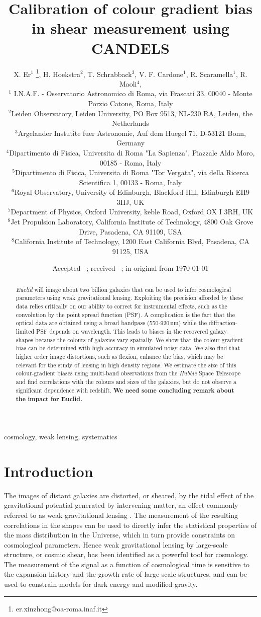 \documentclass[useAMS,usenatbib]{mnras}
\title[Colour gradient bias]
{Calibration of colour gradient bias in shear measurement using CANDELS}
\author[Xer et al.]%
{
X. Er$^1$ \thanks{er.xinzhong@oa-roma.inaf.it},
H. Hoekstra$^2$, T. Schrabback$^3$, V. F. Cardone$^1$, R. Scaramella$^1$, R. Maoli$^4$,
\newauthor{M. Vicinanza$^{1,4,5}$, B. Gillis$^{6}$ L. Miller$^{7}$, J. Rhodes$^{8,9}$}
\\
$^1$ I.N.A.F. - Osservatorio Astronomico di Roma, via Frascati 33, 00040 - Monte Porzio Catone, Roma, Italy\\
$^2$Leiden Observatory, Leiden University, PO Box 9513, NL-230 RA, Leiden, the Netherlands \\
$^3$Argelander Instutite fuer Astronomie, Auf dem Huegel 71, D-53121 Bonn, Germany\\
$^4$Dipartimento di Fisica, Universita di Roma "La Sapienza", Piazzale Aldo Moro, 00185 - Roma, Italy\\
$^5$Dipartimento di Fisica, Universita di Roma "Tor Vergata", via della Ricerca Scientifica 1, 00133 - Roma, Italy\\
$^6$Royal Observatory, University of Edinburgh, Blackford Hill, Edinburgh EH9 3HJ, UK\\
$^7$Department of Physics, Oxford University, keble Road, Oxford OX I 3RH, UK\\
$^8$Jet Propulsion Laboratory, California Institute of Technology, 4800 Oak Grove Drive, Pasadena, CA 91109, USA\\
$^8$California Institute of Technology, 1200 East California Blvd, Pasadena, CA 91125, USA
}
\date{Accepted --;  received --;  in original from \today}
\begin{document}
\maketitle

\begin{abstract}
{\it Euclid} will image about two billion galaxies that can be used to infer cosmological
parameters using weak gravitational lensing. Exploiting the precision afforded by these
data relies critically on our ability to correct for instrumental effects, such as the convolution
by the point spread function (PSF). A complication is the fact  that the optical data
are obtained using a broad bandpass (550-920\,nm) while the diffraction-limited PSF depends
on wavelength. This leads to biases in the recovered galaxy shapes because the colours of 
galaxies vary spatially. 
We show that the colour-gradient bias can be determined with high accuracy in simulated
noisy data. We also find that higher order image distortions, such as flexion, enhance
the bias, which may be relevant for the study of lensing in high density regions.
We estimate the size of this colour-gradient biases using multi-band observations 
from the {\it Hubble} Space Telescope and find correlations with the colours and sizes of
the galaxies, but do not observe a significant dependence with redshift. 
{\bf We need some concluding remark about the impact for Euclid.}

\end{abstract}
\begin{keywords} cosmology, weak lensing, systematics
\end{keywords}


\section{Introduction}

The images of distant galaxies are distorted, or sheared, by the tidal effect of the gravitational  potential generated by intervening matter, an effect commonly referred to as weak gravitational lensing
\citep[e.g.][for a detailed introduction]{Bartelmann01}. The measurement of the resulting correlations in the shapes can be used to directly infer the statistical properties of the mass distribution in the Universe, which in turn provide constraints on cosmological parameters.
Hence weak gravitational lensing by large-scale structure, or cosmic shear, has been identified as a powerful tool for cosmology. The measurement of the signal as a function of cosmological time 
is sensitive to the expansion history and the growth rate of large-scale structures, and can be used to constrain models for dark energy and modified gravity.
\end{document}

